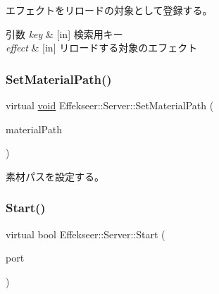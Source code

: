 エフェクトをリロードの対象として登録する。 


\begin{DoxyParams}{引数}
{\em key} & \mbox{[}in\mbox{]} 検索用キー \\
\hline
{\em effect} & \mbox{[}in\mbox{]} リロードする対象のエフェクト \\
\hline
\end{DoxyParams}
\mbox{\label{class_effekseer_1_1_server_a4c0d31a5fd39184615179157a6929296}} 
\subsubsection{\texorpdfstring{Set\+Material\+Path()}{SetMaterialPath()}}
{\footnotesize\ttfamily virtual \mbox{\hyperlink{namespace_effekseer_ab34c4088e512200cf4c2716f168deb56}{void}} Effekseer\+::\+Server\+::\+Set\+Material\+Path (\begin{DoxyParamCaption}\item[{const \mbox{\hyperlink{_effekseer_8h_a50b026abea014b47854bcd835b3b6233}{E\+F\+K\+\_\+\+C\+H\+AR}} $\ast$}]{material\+Path }\end{DoxyParamCaption})\hspace{0.3cm}{\ttfamily [pure virtual]}}



素材パスを設定する。 

\mbox{\label{class_effekseer_1_1_server_afd333e58d1330710673caf909452a4c1}} 
\subsubsection{\texorpdfstring{Start()}{Start()}}
{\footnotesize\ttfamily virtual bool Effekseer\+::\+Server\+::\+Start (\begin{DoxyParamCaption}\item[{uint16\+\_\+t}]{port }\end{DoxyParamCaption})\hspace{0.3cm}{\ttfamily [pure virtual]}}



